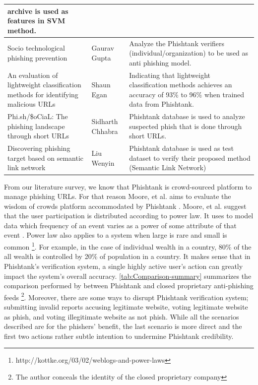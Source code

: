 \begin{longtable}{>{\raggedright}p{3cm}>{\raggedright}p{2cm}>{\raggedright}p{5cm}}
{archive is used as features in SVM method.}\tabularnewline
\midrule 
{\scriptsize{}Socio technological phishing prevention \citep{gupta:2011}} & {\scriptsize{}Gaurav Gupta} & {\scriptsize{}Analyze the Phishtank verifiers (individual/organization)
to be used as anti phishing model.}\tabularnewline
\midrule 
{\scriptsize{}An evaluation of lightweight classification methods
for identifying malicious URLs \citep{egan:2011}} & {\scriptsize{}Shaun Egan} & {\scriptsize{}Indicating that lightweight classification methods achieves
an accuracy of 93\% to 96\% when trained data from Phishtank.}\tabularnewline
\midrule 
{\scriptsize{}Phi.sh/\$oCiaL: The phishing landscape through short
URLs \citep{chhabra:2011}} & {\scriptsize{}Sidharth Chhabra} & {\scriptsize{}Phishtank database is used to analyze suspected phish
that is done through short URLs.}\tabularnewline
\midrule 
{\scriptsize{}Discovering phishing target based on semantic link network
\citep{wenyin:2010}} & {\scriptsize{}Liu Wenyin} & {\scriptsize{}Phishtank database is used as test dataset to verify
their proposed method (Semantic Link Network) }\tabularnewline
\end{longtable}

From our literature survey, we know that Phishtank is crowd-sourced
platform to manage phishing URLs. For that reason Moore, et al. aims
to evaluate the wisdom of crowds platform accommodated by Phishtank
\citep{moore:2008}. Moore, et al. suggest that the user participation
is distributed according to power law. It uses to model data which
frequency of an event varies as a power of some attribute of that
event \citep{lai}. Power law also applies to a system when large
is rare and small is common %
\footnote{http://kottke.org/03/02/weblogs-and-power-laws%
}. For example, in the case of individual wealth in a country, 80\%
of the all wealth is controlled by 20\% of population in a country.
It makes sense that in Phishtank\textquoteright s verification system,
a single highly active user\textquoteright s action can greatly impact
the system\textquoteright s overall accuracy. \autoref{tab:Comparison-summary}
summarizes the comparison performed by \citep{moore:2008} between
Phishtank and closed proprietary anti-phishing feeds%
\footnote{The author conceals the identity of the closed proprietary company%
}. Moreover, there are some ways to disrupt Phishtank verification
system; submitting invalid reports accusing legitimate website, voting
legitimate website as phish, and voting illegitimate website as not
phish. While all the scenarios described are for the phishers' benefit,
the last scenario is more direct and the first two actions rather
subtle intention to undermine Phishtank credibility.

